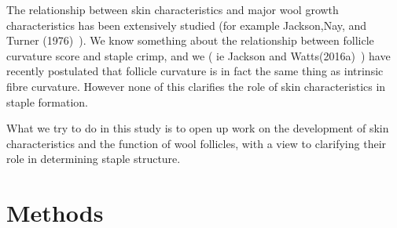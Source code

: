 \documentclass[titlepage]{article}  %
\begin{document}
The relationship between skin characteristics and major wool growth characteristics has been extensively studied (for example Jackson,Nay, and Turner (1976)~\cite{jack:76}). We know something about the relationship between follicle curvature score and staple crimp, and we ( ie Jackson and Watts(2016a)~\cite{jack:16a}) have recently postulated that follicle curvature is in fact the same thing as intrinsic fibre curvature. However none of this  clarifies the role of skin characteristics in staple formation.

What we try to do in this study is to open up work on the development of skin characteristics and the function of wool follicles, with a view to clarifying their role in determining staple structure.

\section{Methods}
\end{document}
